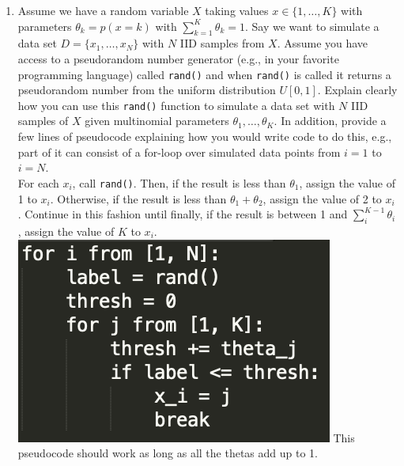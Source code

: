 \documentclass[11pt]{article}
\begin{document}
\begin{enumerate}

\item 
Assume we have a random variable $X$ taking values $x \in \{1,\ldots,K\}$ with parameters $\theta_k = p(x = k)$ with $\sum_{k=1}^K \theta_k = 1$. Say we want to simulate a data set $D = \{x_1,\ldots,x_N\}$ with $N$ IID samples from $X$. Assume you have access to a pseudorandom number generator (e.g., in your favorite programming language)  called {\tt rand()} and when {\tt rand()} is called it returns a pseudorandom number from the uniform distribution $U[0,1]$. Explain clearly how you can use this {\tt rand()} function to simulate a data set with $N$ IID   samples of $X$ given multinomial parameters $\theta_1,\ldots,\theta_K$. In addition, provide a few lines of pseudocode explaining how you would write code to do this, e.g., part of it can consist of a for-loop over simulated data points from $i=1$ to $i=N$. \\ 
For each $x_i$, call {\tt rand()}. Then, if the result is less than $\theta_1$, assign the value of 1 to $x_i$. 
Otherwise, if the result is less than $\theta_1+\theta_2$, assign the value of 2 to $x_i$. 
Continue in this fashion until finally, if the result is between 1 and $\sum_i^{K-1} \theta_i$, assign the value of $K$ to $x_i$. \\
\includegraphics[scale=0.5]{code1.png} This pseudocode should work as long as all the thetas add up to 1.


\end{enumerate}
\end{document}
